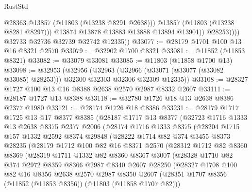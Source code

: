 \begin{lexlean}{RustStd}
\begin{coremodule}
                        @28363
                        @13857
                        (@11803 (@13238 @8291 @2638)))
                      @13857
                      (@11803 (@13238 @8281 @8297)))
                    @13874
                    @13878
                    @13883
                    @13888
                    @13894
                    @13901))
                @28253))))
        @32733
        @32736
        @32739
        @32742
        @12335))
@33077 := @28179 @1701 @100 @13 @16 @8321 @2570
@33079 := @32902 @1700 @8321
@33081 := @11852 (@11853 @8321)
@33082 := @33079 @33081
@33085 := @11803 (@11858 @1700 @13)
@33098 := @32953
    (@32956
      (@32963 (@32966 (@33071 (@33077 (@33082 @33085) @28253))) @32300 @32303 @32306 @32309 @12335))
@33108 := @28327 @1727 @100 @13 @16 @8388 @2638 @2570 @2987 @8332 @2607
@33111 := @28187 @1727 @13 @8388
@33118 := @32780 @1726 @18 @13 @2638 @8386 @2377 @1980
@33121 := @28174 @1726 @18 @8386
@33231 := @28179
    @1717
    @1725
    @13
    @17
    @8377
    @8385
    (@28187
      @1717
      @13
      @8377
      (@32723
        @1716
        @1333
        @13
        @2638
        @8375
        @2377
        @2006
        (@28174
          @1716
          @1333
          @8375
          (@28204
            @1715
            @157
            @1332
            @2592
            @8374
            @29848
            (@28222
              @1714
              @82
              @374
              @3455
              @8373
              @28235
              (@28179
                @1712
                @100
                @82
                @16
                @8371
                @2570
                (@28312
                  @1712
                  @82
                  @8360
                  @8369
                  (@28319
                    @1711
                    @1332
                    @82
                    @8360
                    @8367
                    @3007
                    (@28328
                      @1710
                      @82
                      @374
                      @2972
                      @8359
                      @8366
                      @2987
                      @8340
                      @2607
                      @28250
                      (@28327
                        @1708
                        @100
                        @82
                        @16
                        @8356
                        @2638
                        @2570
                        @2987
                        @8350
                        @2607
                        (@28351 @1707 @8356 (@11852 (@11853 @8356)) (@11803 (@11858 @1707 @82)))

\end{coremodule}
\end{lexlean}
